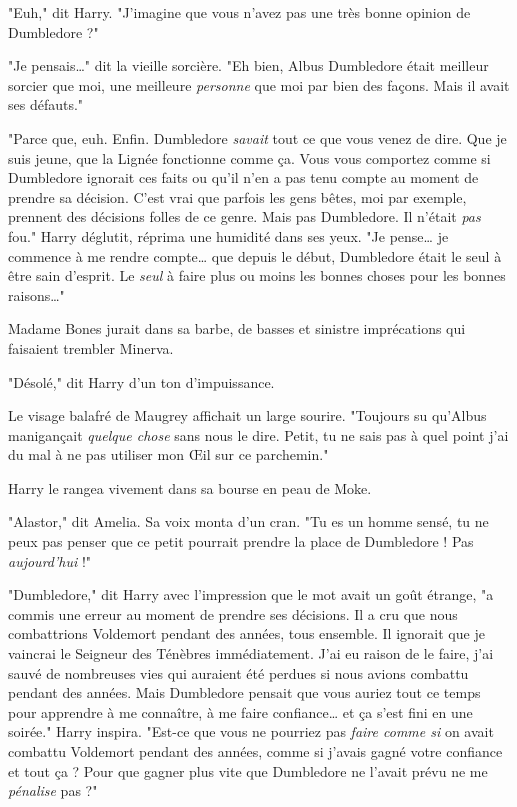 "Euh," dit Harry. "J'imagine que vous n'avez pas une très bonne opinion de Dumbledore ?"

"Je pensais…" dit la vieille sorcière. "Eh bien, Albus Dumbledore était meilleur sorcier que moi, une meilleure \emph{personne}  que moi par bien des façons. Mais il avait ses défauts."

"Parce que, euh. Enfin. Dumbledore \emph{savait}  tout ce que vous venez de dire. Que je suis jeune, que la Lignée fonctionne comme ça. Vous vous comportez comme si Dumbledore ignorait ces faits ou qu'il n'en a pas tenu compte au moment de prendre sa décision. C'est vrai que parfois les gens bêtes, moi par exemple, prennent des décisions folles de ce genre. Mais pas Dumbledore. Il n'était \emph{pas}  fou." Harry déglutit, réprima une humidité dans ses yeux. "Je pense… je commence à me rendre compte… que depuis le début, Dumbledore était le seul à être sain d'esprit. Le \emph{seul}  à faire plus ou moins les bonnes choses pour les bonnes raisons…"

Madame Bones jurait dans sa barbe, de basses et sinistre imprécations qui faisaient trembler Minerva.

"Désolé," dit Harry d'un ton d'impuissance.

Le visage balafré de Maugrey affichait un large sourire. "Toujours su qu'Albus manigançait \emph{quelque chose}  sans nous le dire. Petit, tu ne sais pas à quel point j'ai du mal à ne pas utiliser mon Œil sur ce parchemin."

Harry le rangea vivement dans sa bourse en peau de Moke.

"Alastor," dit Amelia. Sa voix monta d'un cran. "Tu es un homme sensé, tu ne peux pas penser que ce petit pourrait prendre la place de Dumbledore ! Pas \emph{aujourd'hui}  !"

"Dumbledore," dit Harry avec l'impression que le mot avait un goût étrange, "a commis une erreur au moment de prendre ses décisions. Il a cru que nous combattrions Voldemort pendant des années, tous ensemble. Il ignorait que je vaincrai le Seigneur des Ténèbres immédiatement. J'ai eu raison de le faire, j'ai sauvé de nombreuses vies qui auraient été perdues si nous avions combattu pendant des années. Mais Dumbledore pensait que vous auriez tout ce temps pour apprendre à me connaître, à me faire confiance… et ça s'est fini en une soirée." Harry inspira. "Est-ce que vous ne pourriez pas \emph{faire comme si}  on avait combattu Voldemort pendant des années, comme si j'avais gagné votre confiance et tout ça ? Pour que gagner plus vite que Dumbledore ne l'avait prévu ne me \emph{pénalise}  pas ?"

